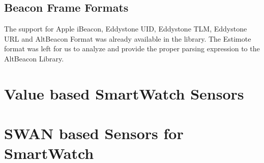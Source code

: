 \subsection{Beacon Frame Formats}
The support for Apple iBeacon, Eddystone UID, Eddystone TLM, Eddystone URL and AltBeacon Format was already available in the library.
The Estimote format was left for us to analyze and provide the proper parsing expression to the AltBeacon Library.


\section{Value based SmartWatch Sensors}

\section{SWAN based Sensors for SmartWatch}

